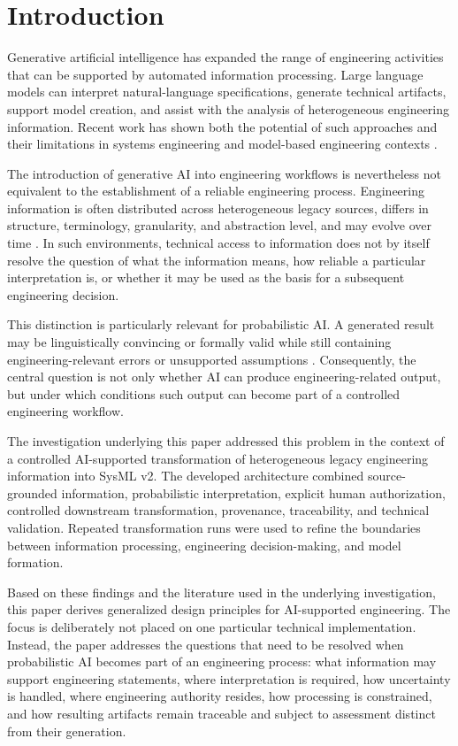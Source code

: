\section{Introduction}

Generative artificial intelligence has expanded the range of engineering activities that
can be supported by automated information processing. Large language models can interpret
natural-language specifications, generate technical artifacts, support model creation, and
assist with the analysis of heterogeneous engineering information. Recent work has shown
both the potential of such approaches and their limitations in systems engineering and
model-based engineering contexts \cite{Topcu2025,Stein2026,Cibrian.2025}.

The introduction of generative AI into engineering workflows is nevertheless not equivalent
to the establishment of a reliable engineering process. Engineering information is often
distributed across heterogeneous legacy sources, differs in structure, terminology,
granularity, and abstraction level, and may evolve over time
\cite{Maheshwari2018,Henderson2024,Legat2014}. In such environments, technical access to
information does not by itself resolve the question of what the information means, how
reliable a particular interpretation is, or whether it may be used as the basis for a
subsequent engineering decision.

This distinction is particularly relevant for probabilistic AI. A generated result may be
linguistically convincing or formally valid while still containing engineering-relevant
errors or unsupported assumptions \cite{Topcu2025,Stein2026}. Consequently, the central
question is not only whether AI can produce engineering-related output, but under which
conditions such output can become part of a controlled engineering workflow.

The investigation underlying this paper addressed this problem in the context of a
controlled AI-supported transformation of heterogeneous legacy engineering information
into SysML v2. The developed architecture combined source-grounded information,
probabilistic interpretation, explicit human authorization, controlled downstream
transformation, provenance, traceability, and technical validation. Repeated transformation
runs were used to refine the boundaries between information processing, engineering
decision-making, and model formation.

Based on these findings and the literature used in the underlying investigation, this paper
derives generalized design principles for AI-supported engineering. The focus is deliberately
not placed on one particular technical implementation. Instead, the paper addresses the
questions that need to be resolved when probabilistic AI becomes part of an engineering
process: what information may support engineering statements, where interpretation is
required, how uncertainty is handled, where engineering authority resides, how processing
is constrained, and how resulting artifacts remain traceable and subject to assessment
distinct from their generation.

